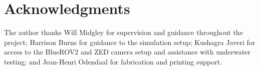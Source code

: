 \section*{Acknowledgments}

The author thanks Will Midgley for supervision and guidance throughout the
project; Harrison Burns for guidance to the simulation setup; Kushagra Javeri for access to the BlueROV2 and ZED camera setup and
assistance with underwater testing; and Jean-Henri Odendaal for fabrication and
printing support.
